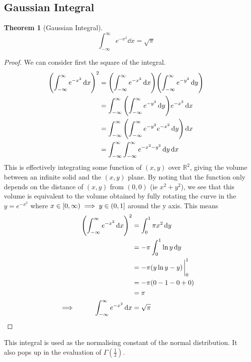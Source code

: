 \documentclass[fleqn,a4paper,11pt]{article}
\newcommand{\setstyle}{\mathbb}
\newcommand{\Reals}{\setstyle R}
\newtheorem{theorem}{Theorem}[section]
\begin{document}
    \subsection{Gaussian Integral}

    \begin{theorem}[Gaussian Integral] \label{thm_gauss_integral}
    \begin{equation*}
    \int_{-\infty}^\infty e^{-x^2} \dd{x} = \sqrt \pi
    \end{equation*}
    \end{theorem}
    \begin{proof}
    We can consider first the square of the integral.
    \begin{align*}
    \pqty{\int_{-\infty}^\infty e^{-x^2} \dd{x}}^2
        &= \pqty{\int_{-\infty}^\infty e^{-x^2} \dd{x}}
           \pqty{\int_{-\infty}^\infty e^{-y^2} \dd{y}} \\
        &= \int_{-\infty}^\infty
                       \pqty{\int_{-\infty}^\infty e^{-y^2} \dd{y}}
                   e^{-x^2} \dd{x} \\
        &= \int_{-\infty}^\infty
               \pqty{\int_{-\infty}^\infty e^{-y^2} e^{-x^2} \dd{y}} \dd{x} \\
        &= \int_{-\infty}^\infty
               \int_{-\infty}^\infty e^{-x^2-y^2} \dd{y} \dd{x}
    \end{align*}
    This is effectively integrating some function of \((x, y)\) over
    \(\Reals^2\), giving the volume between an infinite solid and the \((x, y)\)
    plane. By noting that the function only depends on the distance of
    \((x, y)\) from \((0, 0)\) (ie \(x^2 + y^2\)), we see that this volume is
    equivalent to the volume obtained by fully rotating the curve in the
    \(y = e^{-x^2}\) where
    \(x \in \intco{0, \infty} \implies y \in \intoc{0, 1}\) around the y axis.
    This means
    \begin{alignat*}{2}
    && \pqty{\int_{-\infty}^\infty e^{-x^2} \dd{x}}^2
        &= \int_0^1 \pi x^2 \dd{y} \\
    &&  &= -\pi \int_0^1 \ln y \dd{y} \\
    &&  &= -\pi (y\ln y - y)\eval_0^1 \\
    &&  &= -\pi \pqty{0 - 1 - 0 + 0} \\
    &&  &= \pi \\
    &\implies& \int_{-\infty}^\infty e^{-x^2} \dd{x}
        &= \sqrt \pi \qedhere
    \end{alignat*}
    \end{proof}
    This integral is used as the normalising constant of the normal
    distribution. It also pops up in the evaluation of \(\Gamma(\frac 12)\).
\end{document}
